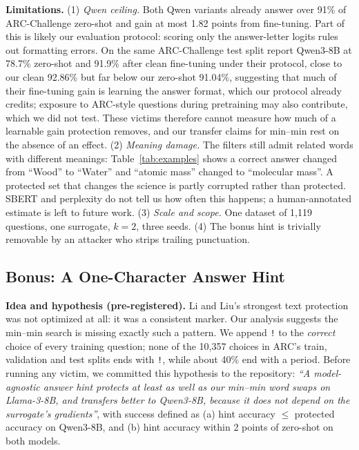 \documentclass{article}
\begin{document}
\textbf{Limitations.} (1) \emph{Qwen ceiling.} Both Qwen variants already answer over 91\% of ARC-Challenge zero-shot and
gain at most 1.82 points from fine-tuning. Part of this is likely our evaluation protocol: scoring only the
answer-letter logits rules out formatting errors. On the same ARC-Challenge test split \citet{zhao2026textcloak} report Qwen3-8B at
78.7\% zero-shot and 91.9\% after clean fine-tuning under their protocol, close to our clean 92.86\% but far
below our zero-shot 91.04\%, suggesting that much of their fine-tuning gain is learning the answer format, which
our protocol already credits; exposure to ARC-style questions during pretraining may also contribute, which we did not test. These
victims therefore cannot measure how much of a learnable gain protection removes, and our transfer claims for min--min rest on
the absence of an effect. (2) \emph{Meaning damage.} The filters still admit related words with different meanings:
Table~\ref{tab:examples} shows a correct answer changed from ``Wood'' to ``Water'' and ``atomic mass'' changed to
``molecular mass''. A protected set that changes the science is partly corrupted rather than protected. SBERT and
perplexity do not tell us how often this happens; a human-annotated estimate is left to future work. (3) \emph{Scale and scope.} One dataset of 1{,}119 questions, one surrogate, $k=2$, three seeds. (4) The bonus hint
is trivially removable by an attacker who strips trailing punctuation.

\subsection{Bonus: A One-Character Answer Hint}\label{sec:bonus}
\textbf{Idea and hypothesis (pre-registered).} Li and Liu's strongest text protection was not optimized at all: it was a
consistent marker. Our analysis suggests the min--min search is missing exactly such a pattern. We append \texttt{!} to
the \emph{correct} choice of every training question; none of the 10{,}357 choices in ARC's train, validation and test
splits ends with \texttt{!}, while about 40\% end with a period. Before running any victim, we committed this
hypothesis to the repository: \emph{``A model-agnostic answer hint protects at least as well as our min--min word swaps on
Llama-3-8B, and transfers better to Qwen3-8B, because it does not depend on the surrogate's gradients''}, with success
defined as (a) hint accuracy $\le$ protected accuracy on Qwen3-8B, and (b) hint accuracy within 2 points of zero-shot on
both models.
\end{document}
